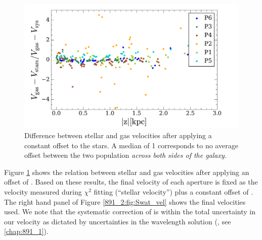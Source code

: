 


\begin{figure}[t]
  \centering
  \includegraphics[width=\columnwidth]{891_2/figs/SG_diff.pdf}
  \caption[Offset between stellar and gas
    velocities]{\fixspacing\label{891_2:fig:SG_offset}Difference
    between stellar and gas velocities after applying a constant
     offset to the stars. A median of 1 corresponds to
    no average offset between the two population \emph{across both
      sides of the galaxy}.}
\end{figure}

Figure \ref{891_2:fig:SG_offset} shows the relation between stellar and gas
velocities after applying an offset of . Based on these
results, the final velocity of each aperture is fixed as the velocity
measured during $\chi^2$ fitting (``stellar velocity'') plus a
constant offset of . The right hand panel of Figure
\ref{891_2:fig:Swat_vel} shows the final velocities used. We note that the
systematic correction of  is within the total
uncertainty in our velocity as dictated by uncertainties in the
wavelength solution (, see \ref{chap:891_1}).

